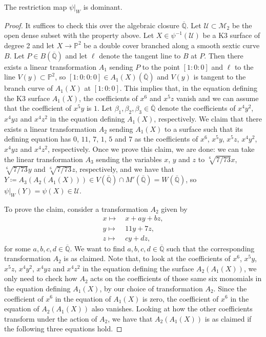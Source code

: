 \documentclass[10pt,a4paper]{amsart}
\newcommand{\PP}{\mathbb{P}}
\newcommand{\QQ}{\mathbb{Q}}
\begin{document}
\begin{lemma} \label{dominant}
The restriction map $\psi|_{W}$ is dominant. 
\end{lemma}

\begin{proof}
It suffices to check this over the algebraic closure $\overline{\QQ}$. Let $\mathcal{U}\subset \mathcal{M}_2$ be the open dense subset with the property above. Let $X\in \psi^{-1}(\mathcal{U})$ be a K3 surface of degree 2 and let $X\rightarrow \PP^2$ be a double cover branched along a smooth sextic curve $B$. Let $P\in B(\overline{\QQ}) $ and let $\ell$ denote the tangent line to $B$ at $P$. Then there exists a linear transformation $A_1$ sending $P$ to the point $[1:0:0]$ and $\ell$ to the line $V(y)\subset \PP^2$, so $[1:0:0:0]\in A_1(X)(\overline{\QQ})$ and $V(y)$ is tangent to the branch curve of $A_1(X)$ at $[1:0:0]$. This implies that, in the equation defining the K3 surface $A_1(X)$, the coefficients of $x^6$ and $x^5z$ vanish and we can assume that the coefficient of $x^5y$ is $1$. Let $\beta_1, \beta_2, \beta_3 \in \overline{\QQ}$ denote the coefficients of $x^4y^2$, $x^4yz$ and $x^4z^2$ in the equation defining $A_1(X)$, respectively. We claim that there exists a linear transformation $A_2$ sending $A_1(X)$ to a surface such that its defining equation has $0$, $11$, $7$, $1$, $5$ and $7$ as the coefficients of $x^6$, $x^5y$, $x^5z$, $x^4y^2$, $x^4yz$ and $x^4z^2$, respectively.
Once we prove this claim, we are done: we can take the linear transformation $A_3$ sending the variables $x$, $y$ and $z$ to $\sqrt[6]{7/73}x$, $\sqrt[6]{7/73}y$ and $\sqrt[6]{7/73}z$, respectively, and we have that $Y \coloneqq A_3(A_2(A_1(X)))\in V(\overline{\QQ})\cap M'(\overline{\QQ})=W(\overline{\QQ})$, so $\psi|_{W}(Y)=\psi(X)\in \mathcal{U}$. 

To prove the claim, consider a transformation $A_2$ given by
\begin{align*}
x \mapsto &  \ x+ay+bz, \\
y \mapsto & \  11y+7z, \\
z \mapsto & \ cy+dz,
\end{align*}
for some $a,b,c,d\in \overline{\QQ}$. We want to find $a,b,c,d\in \overline{\QQ}$ such that the corresponding transformation $A_2$ is as claimed. Note that, to look at the coefficients of $x^6$, $x^5y$, $x^5z$, $x^4y^2$, $x^4yz$ and $x^4z^2$ in the equation defining the surface $A_2(A_1(X))$, we only need to check how $A_2$ acts on the coefficients of those same six monomials in the equation defining $A_1(X)$, by our choice of transformation $A_2$. Since the coefficient of $x^6$ in the equation of $A_1(X)$ is zero, the coefficient of $x^6$ in the equation of $A_2(A_1(X))$ also vanishes. Looking at how the other coefficients transform under the action of $A_2$, we have that $A_2(A_1(X))$ is as claimed if the following three equations hold.


\end{proof}
\end{document}
